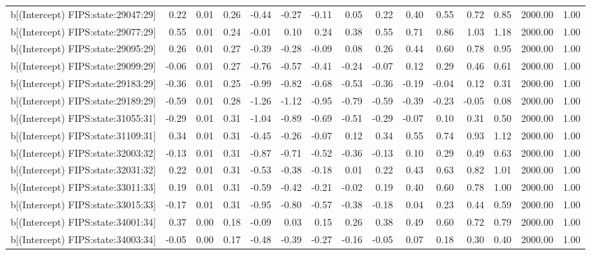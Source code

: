 \begin{table}[ht]
\begin{tabular}{rrrrrrrrrrrrrrr}
  b[(Intercept) FIPS:state:29047:29] & 0.22 & 0.01 & 0.26 & -0.44 & -0.27 & -0.11 & 0.05 & 0.22 & 0.40 & 0.55 & 0.72 & 0.85 & 2000.00 & 1.00 \\ 
  b[(Intercept) FIPS:state:29077:29] & 0.55 & 0.01 & 0.24 & -0.01 & 0.10 & 0.24 & 0.38 & 0.55 & 0.71 & 0.86 & 1.03 & 1.18 & 2000.00 & 1.00 \\ 
  b[(Intercept) FIPS:state:29095:29] & 0.26 & 0.01 & 0.27 & -0.39 & -0.28 & -0.09 & 0.08 & 0.26 & 0.44 & 0.60 & 0.78 & 0.95 & 2000.00 & 1.00 \\ 
  b[(Intercept) FIPS:state:29099:29] & -0.06 & 0.01 & 0.27 & -0.76 & -0.57 & -0.41 & -0.24 & -0.07 & 0.12 & 0.29 & 0.46 & 0.61 & 2000.00 & 1.00 \\ 
  b[(Intercept) FIPS:state:29183:29] & -0.36 & 0.01 & 0.25 & -0.99 & -0.82 & -0.68 & -0.53 & -0.36 & -0.19 & -0.04 & 0.12 & 0.31 & 2000.00 & 1.00 \\ 
  b[(Intercept) FIPS:state:29189:29] & -0.59 & 0.01 & 0.28 & -1.26 & -1.12 & -0.95 & -0.79 & -0.59 & -0.39 & -0.23 & -0.05 & 0.08 & 2000.00 & 1.00 \\ 
  b[(Intercept) FIPS:state:31055:31] & -0.29 & 0.01 & 0.31 & -1.04 & -0.89 & -0.69 & -0.51 & -0.29 & -0.07 & 0.10 & 0.31 & 0.50 & 2000.00 & 1.00 \\ 
  b[(Intercept) FIPS:state:31109:31] & 0.34 & 0.01 & 0.31 & -0.45 & -0.26 & -0.07 & 0.12 & 0.34 & 0.55 & 0.74 & 0.93 & 1.12 & 2000.00 & 1.00 \\ 
  b[(Intercept) FIPS:state:32003:32] & -0.13 & 0.01 & 0.31 & -0.87 & -0.71 & -0.52 & -0.36 & -0.13 & 0.10 & 0.29 & 0.49 & 0.63 & 2000.00 & 1.00 \\ 
  b[(Intercept) FIPS:state:32031:32] & 0.22 & 0.01 & 0.31 & -0.53 & -0.38 & -0.18 & 0.01 & 0.22 & 0.43 & 0.63 & 0.82 & 1.01 & 2000.00 & 1.00 \\ 
  b[(Intercept) FIPS:state:33011:33] & 0.19 & 0.01 & 0.31 & -0.59 & -0.42 & -0.21 & -0.02 & 0.19 & 0.40 & 0.60 & 0.78 & 1.00 & 2000.00 & 1.00 \\ 
  b[(Intercept) FIPS:state:33015:33] & -0.17 & 0.01 & 0.31 & -0.95 & -0.80 & -0.57 & -0.38 & -0.18 & 0.04 & 0.23 & 0.44 & 0.59 & 2000.00 & 1.00 \\ 
  b[(Intercept) FIPS:state:34001:34] & 0.37 & 0.00 & 0.18 & -0.09 & 0.03 & 0.15 & 0.26 & 0.38 & 0.49 & 0.60 & 0.72 & 0.79 & 2000.00 & 1.00 \\ 
  b[(Intercept) FIPS:state:34003:34] & -0.05 & 0.00 & 0.17 & -0.48 & -0.39 & -0.27 & -0.16 & -0.05 & 0.07 & 0.18 & 0.30 & 0.40 & 2000.00 & 1.00 \\ 

\end{tabular}
\end{table}
